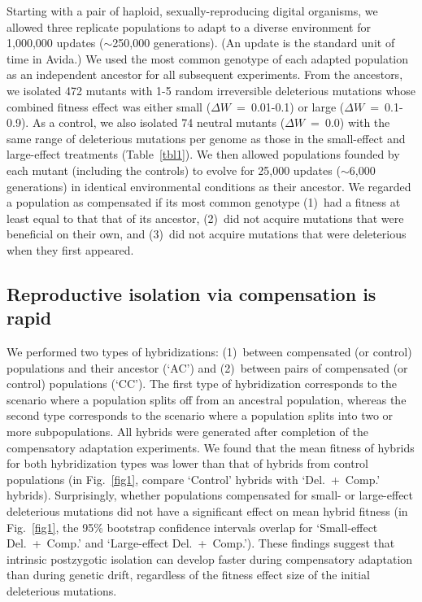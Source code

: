 \documentclass[11pt]{article}
\begin{document}
Starting with a pair of haploid, sexually-reproducing digital organisms,
we allowed three replicate populations to adapt to a diverse environment
for 1,000,000 updates ($\sim$250,000 generations).
%
(An update is the standard unit of time in Avida.)
%
We used the most common genotype of each adapted population
as an independent ancestor for all subsequent experiments.
%
From the ancestors, we isolated 472 mutants
with 1-5 random irreversible deleterious mutations
whose combined fitness effect was either
small ($\Delta W$~=~0.01-0.1) or large ($\Delta W$~=~0.1-0.9).
%
As a control, we also isolated 74 neutral mutants ($\Delta W$~=~0.0)
with the same range of deleterious mutations per genome as those
in the small-effect and large-effect treatments (Table~\ref{tbl1}).
%
We then allowed populations founded by each mutant (including the controls)
to evolve for 25,000 updates ($\sim$6,000 generations)
in identical environmental conditions as their ancestor.
%
We regarded a population as compensated if its most common genotype
(1)~had a fitness at least equal to that that of its ancestor,
(2)~did not acquire mutations that were beneficial on their own, and
(3)~did not acquire mutations that were deleterious when they first appeared.



\subsection*{Reproductive isolation via compensation is rapid}

We performed two types of hybridizations:
(1)~between compensated (or control) populations and their ancestor (`AC')
and (2)~between pairs of compensated (or control) populations (`CC').
%
The first type of hybridization corresponds to the scenario where
a population splits off from an ancestral population,
whereas the second type corresponds to the scenario where
a population splits into two or more subpopulations.
%
All hybrids were generated after completion
of the compensatory adaptation experiments.
%
We found that the mean fitness of hybrids for both hybridization types
was lower than that of hybrids from control populations
(in Fig.~\ref{fig1}, compare `Control' hybrids with `Del.~+~Comp.' hybrids).
%
Surprisingly, whether populations compensated for
small- or large-effect deleterious mutations
did not have a significant effect on mean hybrid fitness
(in Fig.~\ref{fig1}, the 95\% bootstrap confidence intervals overlap for
`Small-effect Del.~+~Comp.' and `Large-effect Del.~+~Comp.').
%
These findings suggest that intrinsic postzygotic isolation
can develop faster during compensatory adaptation than during genetic drift,
regardless of the fitness effect size of the initial deleterious mutations.
\end{document}
